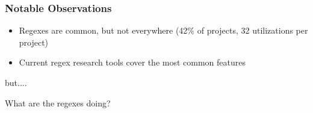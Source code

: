 %
%


\begin{frame}
\frametitle{Notable Observations}

\begin{block}{}
\begin{itemize}
	\item Regexes are common, but not everywhere (42\% of projects, 32 utilizations per project)
	\item Current regex research tools cover the most common features
\end{itemize}
\end{block}

but....

\begin{block}{}
What are the regexes doing?
\end{block}


\end{frame}

